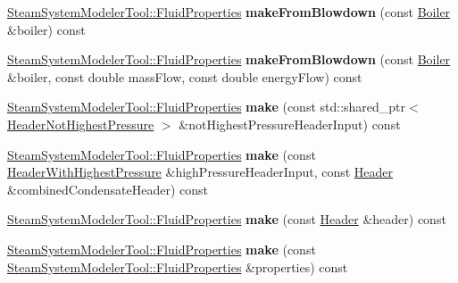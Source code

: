 \begin{DoxyCompactItemize}
\item 
\mbox{\label{class_fluid_properties_factory_a8f695ab1e219c872a308598ef99d63d2}} 
\hyperlink{struct_steam_system_modeler_tool_1_1_fluid_properties}{Steam\+System\+Modeler\+Tool\+::\+Fluid\+Properties} {\bfseries make\+From\+Blowdown} (const \hyperlink{class_boiler}{Boiler} \&boiler) const
\item 
\mbox{\label{class_fluid_properties_factory_a29f4d516c2f7a4780b1acaec8d39f77f}} 
\hyperlink{struct_steam_system_modeler_tool_1_1_fluid_properties}{Steam\+System\+Modeler\+Tool\+::\+Fluid\+Properties} {\bfseries make\+From\+Blowdown} (const \hyperlink{class_boiler}{Boiler} \&boiler, const double mass\+Flow, const double energy\+Flow) const
\item 
\mbox{\label{class_fluid_properties_factory_a5eab55f93cb93ba11dc21b39c7ae20ef}} 
\hyperlink{struct_steam_system_modeler_tool_1_1_fluid_properties}{Steam\+System\+Modeler\+Tool\+::\+Fluid\+Properties} {\bfseries make} (const std\+::shared\+\_\+ptr$<$ \hyperlink{class_header_not_highest_pressure}{Header\+Not\+Highest\+Pressure} $>$ \&not\+Highest\+Pressure\+Header\+Input) const
\item 
\mbox{\label{class_fluid_properties_factory_a5abeba1ebc4f0c7f9d1eaf292b0e4abe}} 
\hyperlink{struct_steam_system_modeler_tool_1_1_fluid_properties}{Steam\+System\+Modeler\+Tool\+::\+Fluid\+Properties} {\bfseries make} (const \hyperlink{class_header_with_highest_pressure}{Header\+With\+Highest\+Pressure} \&high\+Pressure\+Header\+Input, const \hyperlink{class_header}{Header} \&combined\+Condensate\+Header) const
\item 
\mbox{\label{class_fluid_properties_factory_a846d99dff93d2cca276fc00e6d65143a}} 
\hyperlink{struct_steam_system_modeler_tool_1_1_fluid_properties}{Steam\+System\+Modeler\+Tool\+::\+Fluid\+Properties} {\bfseries make} (const \hyperlink{class_header}{Header} \&header) const
\item 
\mbox{\label{class_fluid_properties_factory_ad4f3d4504e5c46fe39da14ac5035291a}} 
\hyperlink{struct_steam_system_modeler_tool_1_1_fluid_properties}{Steam\+System\+Modeler\+Tool\+::\+Fluid\+Properties} {\bfseries make} (const \hyperlink{struct_steam_system_modeler_tool_1_1_fluid_properties}{Steam\+System\+Modeler\+Tool\+::\+Fluid\+Properties} \&properties) const

\end{DoxyCompactItemize}
